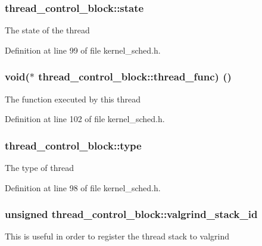 \subsubsection[{\texorpdfstring{state}{state}}]{ thread\+\_\+control\+\_\+block\+::state}\hypertarget{structthread__control__block_affd872365cf4768fa1c9bd1e196bb97c}{}\label{structthread__control__block_affd872365cf4768fa1c9bd1e196bb97c}
The state of the thread 

Definition at line 99 of file kernel\+\_\+sched.\+h.

\subsubsection[{\texorpdfstring{thread\+\_\+func}{thread_func}}]{\setlength{\rightskip}{0pt plus 5cm}void($\ast$ thread\+\_\+control\+\_\+block\+::thread\+\_\+func) ()}\hypertarget{structthread__control__block_a91a73f2ad3f727b7412b912b3d65109a}{}\label{structthread__control__block_a91a73f2ad3f727b7412b912b3d65109a}
The function executed by this thread 

Definition at line 102 of file kernel\+\_\+sched.\+h.

\subsubsection[{\texorpdfstring{type}{type}}]{ thread\+\_\+control\+\_\+block\+::type}\hypertarget{structthread__control__block_abd0f40bdcb22c701df03f560bbc42d5c}{}\label{structthread__control__block_abd0f40bdcb22c701df03f560bbc42d5c}
The type of thread 

Definition at line 98 of file kernel\+\_\+sched.\+h.

\subsubsection[{\texorpdfstring{valgrind\+\_\+stack\+\_\+id}{valgrind_stack_id}}]{\setlength{\rightskip}{0pt plus 5cm}unsigned thread\+\_\+control\+\_\+block\+::valgrind\+\_\+stack\+\_\+id}\hypertarget{structthread__control__block_ad8a2da36c0ad775c12c5f66f4fec9d41}{}\label{structthread__control__block_ad8a2da36c0ad775c12c5f66f4fec9d41}
This is useful in order to register the thread stack to valgrind 

